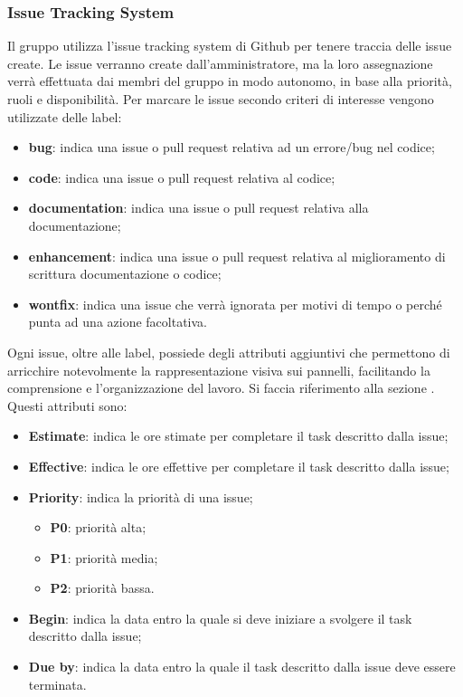         \subsubsection{Issue Tracking System}\label{inf:its}
        Il gruppo utilizza l'issue tracking system di Github per tenere traccia delle issue create. Le issue verranno
        create dall'amministratore, ma la loro assegnazione verrà effettuata dai membri del gruppo in modo autonomo, in base
        alla priorità, ruoli e disponibilità.
        Per marcare le issue secondo criteri di interesse vengono utilizzate delle label:
        \begin{itemize}
            \item \textbf{bug}: indica una issue o pull request relativa ad un errore/bug nel codice;
            \item \textbf{code}: indica una issue o pull request relativa al codice;
            \item \textbf{documentation}: indica una issue o pull request relativa alla documentazione;
            \item \textbf{enhancement}: indica una issue o pull request relativa al miglioramento di scrittura documentazione o codice;
            \item \textbf{wontfix}: indica una issue che verrà ignorata per motivi di tempo o perché punta ad una azione facoltativa.
        \end{itemize}
        Ogni issue, oltre alle label, possiede degli attributi aggiuntivi che permettono di arricchire
        notevolmente la rappresentazione visiva sui pannelli, facilitando la comprensione e l'organizzazione del lavoro.
        Si faccia riferimento alla sezione .
        Questi attributi sono:
        \begin{itemize}
            \item \textbf{Estimate}: indica le ore stimate per completare il task descritto dalla issue;
            \item \textbf{Effective}: indica le ore effettive per completare il task descritto dalla issue;
            \item \textbf{Priority}: indica la priorità di una issue;
            \begin{itemize}
                \item \textbf{P0}: priorità alta;
                \item \textbf{P1}: priorità media;
                \item \textbf{P2}: priorità bassa.
            \end{itemize}
            \item \textbf{Begin}: indica la data entro la quale si deve iniziare a svolgere il task descritto dalla issue;
            \item \textbf{Due by}: indica la data entro la quale il task descritto dalla issue deve essere terminata.
        \end{itemize}

